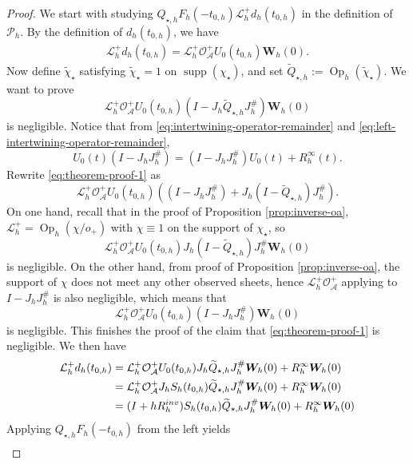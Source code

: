 \documentclass[10pt,a4paper]{amsart}
\newcommand{\Op}{\operatorname{Op}}
\begin{document}
\begin{proof}
We start with studying $Q_{\star,h}F_h(-t_{0,h})\mathcal L_h^+d_h(t_{0,h})$ in the definition of $\mathscr P_h$. By the definition of $d_h(t_{0,h})$, we have
\begin{align*}
    \mathcal L_h^+d_h(t_{0,h}) = \mathcal L_h^+\mathcal O_{\mathcal A}^+U_0(t_{0,h})\bm{W}_h(0).
\end{align*}
Now define $\widetilde{\chi}_\star$ satisfying $\widetilde{\chi}_\star=1$ on $\operatorname{supp}(\chi_\star)$, and set $\widetilde Q_{\star,h}:=\Op_h(\widetilde\chi_\star)$. We want to prove 
\begin{equation}\label{eq:theorem-proof-1}
    \mathcal L_h^+\mathcal O_{\mathcal A}^+U_0(t_{0,h})(I-J_h\widetilde{Q}_{\star,h}J_h^\#)\bm{W}_h(0)
\end{equation}
is negligible. Notice that from \eqref{eq:intertwining-operator-remainder} and \eqref{eq:left-intertwining-operator-remainder},
$$
    U_0(t)(I-J_hJ_h^\#) = (I-J_hJ_h^\#)U_0(t)+R_h^\infty(t).
$$
Rewrite \eqref{eq:theorem-proof-1} as
$$
    \mathcal L_h^+\mathcal O_{\mathcal A}^+U_0(t_{0,h})\left((I-J_hJ_h^\#) + J_h(I-\widetilde{Q}_{\star,h})J_h^\#\right).
$$
On one hand, recall that in the proof of Proposition \ref{prop:inverse-oa}, $\mathcal L_h^+=\Op_h(\chi/o_+)$ with $\chi\equiv 1$ on the support of $\chi_\star$, so 
$$
    \mathcal L_h^+\mathcal O_{\mathcal A}^+U_0(t_{0,h})J_h(I-\widetilde{Q}_{\star,h})J_h^\#\bm{W}_h(0)
$$
is negligible. On the other hand, from proof of Proposition \ref{prop:inverse-oa}, the support of $\chi$ does not meet any other observed sheets, hence $\mathcal L_h^+\mathcal O_{\mathcal A}^+$ applying to $I-J_hJ_h^\#$ is also negligible, which means that
$$
    \mathcal L_h^+\mathcal O_{\mathcal A}^+U_0(t_{0,h})(I-J_hJ_h^\#)\bm{W}_h(0)
$$
is negligible. This finishes the proof of the claim that \eqref{eq:theorem-proof-1} is negligible. We then have
\begin{align*}
    \mathcal L_h^+d_h(t_{0,h}) &= \mathcal L_h^+\mathcal O_{\mathcal A}^+U_0(t_{0,h})J_h\widetilde{Q}_{\star,h}J_h^\#\bm{W}_h(0)+R_h^\infty\bm{W}_h(0)\\ 
    &= \mathcal L_h^+\mathcal O_{\mathcal A}^+J_hS_h(t_{0,h})\widetilde{Q}_{\star,h}J_h^\#\bm{W}_h(0)+R_h^\infty\bm{W}_h(0)\\
    &= (I+hR_h^{\rm inv})S_h(t_{0,h})\widetilde{Q}_{\star,h}J_h^\#\bm{W}_h(0)+R_h^\infty\bm{W}_h(0)
\end{align*}
Applying $Q_{\star,h}F_h(-t_{0,h})$ from the left yields
\begin{align*}

\end{align*}
\end{proof}
\end{document}
